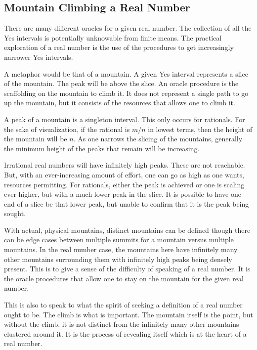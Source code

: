 \documentclass[12pt]{article}
\begin{document}
\subsection{Mountain Climbing a Real Number}

There are many different oracles for a given real number. The collection of all the Yes intervals is potentially unknowable from finite means. The practical exploration of a real number is the use of the procedures to get increasingly narrower Yes intervals.  

A metaphor would be that of a mountain. A given Yes interval represents a slice of the mountain. The peak will be above the slice. An oracle procedure is the scaffolding on the mountain to climb it. It does not represent a single path to go up the mountain, but it consists of the resources that allows one to climb it. 

A peak of a mountain is a singleton interval. This only occurs for rationals. For the sake of visualization, if the rational is $m/n$ in lowest terms, then the height of the mountain will be $n$. As one narrows the slicing of the mountains, generally the minimum height of the peaks that remain will be increasing. 

Irrational real numbers will have infinitely high peaks. These are not reachable. But, with an ever-increasing amount of effort, one can go as high as one wants, resources permitting. For rationals, either the peak is achieved or one is scaling ever higher, but with a much lower peak in the slice. It is possible to have one end of a slice be that lower peak, but unable to confirm that it is the peak being sought. 

With actual, physical mountains, distinct mountains can be defined though there can be edge cases between multiple summits for a mountain versus multiple mountains. In the real number case, the mountains here have infinitely many other mountains surrounding them with infinitely high peaks being densely present. This is to give a sense of the difficulty of speaking of a real number. It is the oracle procedures that allow one to stay on the mountain for the given real number. 

This is also to speak to what the spirit of seeking a definition of a real number ought to be. The climb is what is important. The mountain itself is the point, but without the climb, it is not distinct from the infinitely many other mountains clustered around it. It is the process of revealing itself which is at the heart of a real number. 
\end{document}
